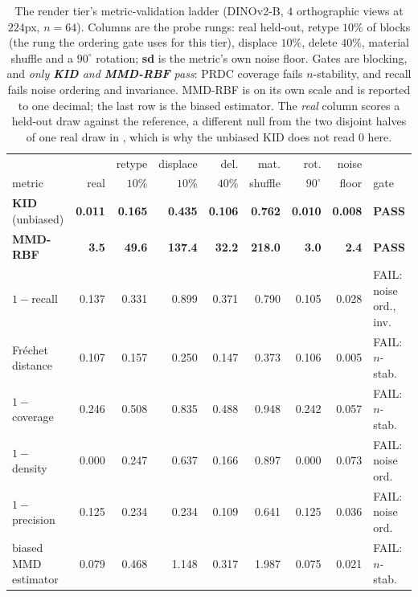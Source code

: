 \begin{table}[t]
\centering
\small
\caption{The render tier's metric-validation ladder (DINOv2-B, $4$ orthographic
views at $224$px, $n{=}64$). Columns are the probe rungs: real held-out, retype
$10\%$ of blocks (the rung the ordering gate uses for this tier), displace
$10\%$, delete $40\%$, material shuffle and a $90^\circ$ rotation; \textbf{sd}
is the metric's own noise floor. Gates are blocking, and \emph{only \textbf{KID}
and \textbf{MMD-RBF} pass}: PRDC coverage fails $n$-stability, and recall fails noise
ordering and invariance.
MMD-RBF is on its own scale and is reported to one decimal; the last row is the
biased estimator. The \emph{real} column scores a held-out draw against the reference, a
different null from the two disjoint halves of one real draw in , which
is why the unbiased KID does not read $0$ here.}
\label{tab:ladder-render}
\setlength{\tabcolsep}{3.5pt}
\begin{tabular}{lrrrrrrrl}
\toprule
       &      & retype   & displace & del.    & mat.    & rot.            & noise &      \\
metric & real & $10\%$ & $10\%$ & $40\%$ & shuffle & $90^\circ$ & floor & gate \\
\midrule
\textbf{KID} (unbiased) & \textbf{0.011} & \textbf{0.165} & \textbf{0.435} & \textbf{0.106} & \textbf{0.762} & \textbf{0.010} & \textbf{0.008} & \textbf{PASS} \\
\textbf{MMD-RBF} & \textbf{3.5} & \textbf{49.6} & \textbf{137.4} & \textbf{32.2} & \textbf{218.0} & \textbf{3.0} & \textbf{2.4} & \textbf{PASS} \\
$1-$recall & 0.137 & 0.331 & 0.899 & 0.371 & 0.790 & 0.105 & 0.028 & FAIL: noise ord., inv. \\
Fr\'echet distance & 0.107 & 0.157 & 0.250 & 0.147 & 0.373 & 0.106 & 0.005 & FAIL: $n$-stab. \\
$1-$coverage & 0.246 & 0.508 & 0.835 & 0.488 & 0.948 & 0.242 & 0.057 & FAIL: $n$-stab. \\
$1-$density & 0.000 & 0.247 & 0.637 & 0.166 & 0.897 & 0.000 & 0.073 & FAIL: noise ord. \\
$1-$precision & 0.125 & 0.234 & 0.234 & 0.109 & 0.641 & 0.125 & 0.036 & FAIL: noise ord. \\
biased MMD estimator & 0.079 & 0.468 & 1.148 & 0.317 & 1.987 & 0.075 & 0.021 & FAIL: $n$-stab. \\
\bottomrule
\end{tabular}
\end{table}

